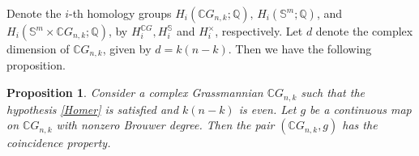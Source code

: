 \documentclass{amsart}
\newtheorem{proposition}[theorem]{Proposition}
\begin{document}
	
	
	Denote the $i$-th homology %
groups 
	$H_i(\mathbb{C}G_{n,k}; \mathbb{Q}), \, H_i(\mathbb{S}^m; \mathbb{Q})$, and 
	$H_i(\mathbb{S}^m \times \mathbb{C}G_{n,k}; \mathbb{Q})$, by %
$H_i^{\mathbb{C}G}, H_i^{\mathbb{S}}$ and $H_i^{\times}$, respectively. Let $d$ denote the complex dimension of $\mathbb CG_{n,k}$, given by $d = k(n - k)$. Then we have the following proposition.
	\begin{proposition}\label{CP of CGnk}
		Consider a complex Grassmannian $\mathbb{C}G_{n,k}$ such that the hypothesis \eqref{Homer} is satisfied and $k(n-k)$ is even. Let $g $ be a continuous map on $\mathbb{C}G_{n,k}$ with nonzero Brouwer degree. Then the pair $(\mathbb{C}G_{n,k}, g)$ has the coincidence property.
	\end{proposition}
	
\end{document}
